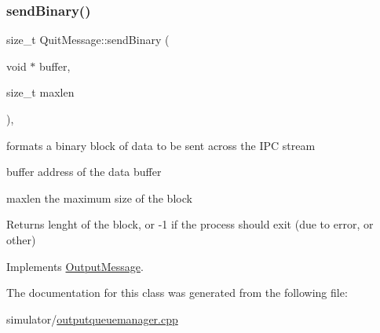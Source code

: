 \mbox{\label{class_quit_message_ae36862391f3a9f21a67a76074e082fe6}} 
\subsubsection{\texorpdfstring{sendBinary()}{sendBinary()}}
{\footnotesize\ttfamily size\+\_\+t Quit\+Message\+::send\+Binary (\begin{DoxyParamCaption}\item[{void $\ast$}]{buffer,  }\item[{size\+\_\+t}]{maxlen }\end{DoxyParamCaption})\hspace{0.3cm}{\ttfamily [inline]}, {\ttfamily [virtual]}}



formats a binary block of data to be sent across the I\+PC stream 

\begin{DoxyItemize}
\item buffer address of the data buffer \item maxlen the maximum size of the block \begin{DoxyReturn}{Returns}
lenght of the block, or -\/1 if the process should exit (due to error, or other) 
\end{DoxyReturn}
\end{DoxyItemize}


Implements \mbox{\hyperlink{class_output_message_a42e0a2560b1bf9e58b6626056f87b8c2}{Output\+Message}}.



The documentation for this class was generated from the following file\+:\begin{DoxyCompactItemize}
\item 
simulator/\mbox{\hyperlink{outputqueuemanager_8cpp}{outputqueuemanager.\+cpp}}\end{DoxyCompactItemize}
